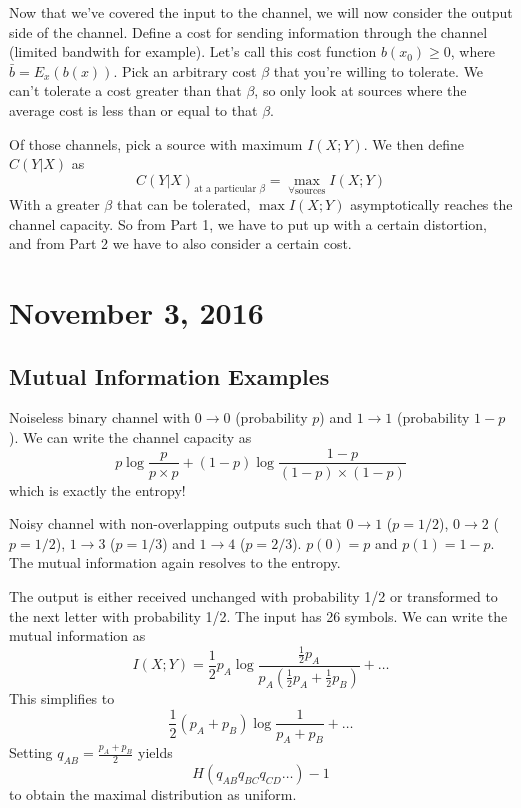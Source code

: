 \documentclass[11pt]{article}
\theoremstyle{definition}
\begin{document}
Now that we've covered the input to the channel, we will now consider the output side of the channel. Define a cost for sending information through the channel (limited bandwith for example). Let's call this cost function $b(x_0) \geq 0$, where $\bar{b} = E_x(b(x))$. Pick an arbitrary cost $\beta$ that you're willing to tolerate. We can't tolerate a cost greater than that $\beta$, so only look at sources where the average cost is less than or equal to that $\beta$. 

Of those channels, pick a source with maximum $I(X;Y)$. We then define $C(Y|X)$ as $$C(Y|X)_{\text{at a particular } \beta} = \max_{\forall \text{sources}} I(X;Y)$$
With a greater $\beta$ that can be tolerated, $\max I(X;Y)$ asymptotically reaches the channel capacity. So from Part 1, we have to put up with a certain distortion, and from Part 2 we have to also consider a certain cost. 
\section{November 3, 2016}

\subsection{Mutual Information Examples}

\example Noiseless binary channel with $0 \rightarrow 0$ (probability $p$) and $1 \rightarrow 1$ (probability $1-p$). We can write the channel capacity as $$p \log \frac{p}{p \times p} + (1-p) \log \frac{1-p}{(1-p) \times (1-p)}$$which is exactly the entropy!

\example Noisy channel with non-overlapping outputs such that $0 \rightarrow 1$ ($p = 1/2$), $0 \rightarrow 2$ ($p = 1/2$), $1 \rightarrow 3$ ($p = 1/3$) and $1 \rightarrow 4$ ($p = 2/3$). $p(0) = p$ and $p(1) = 1-p$. The mutual information again resolves to the entropy.

 The output is either received unchanged with probability 1/2 or transformed to the next letter with probability 1/2. The input has 26 symbols. We can write the mutual information as $$I(X;Y) = \frac{1}{2} p_A \log \frac{\frac{1}{2}p_A}{p_A\left(\frac{1}{2}p_A + \frac{1}{2}p_B\right)} + \dots $$This simplifies to $$\frac{1}{2}(p_A + p_B) \log \frac{1}{p_A + p_B} + \dots $$Setting $q_{AB} = \frac{p_A + p_B}{2}$ yields $$H(q_{AB}q_{BC}q_{CD}\dots) - 1$$to obtain the maximal distribution as uniform.

\end{document}
